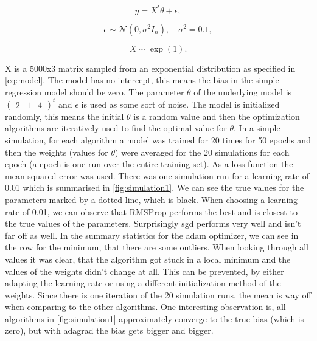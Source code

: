 \documentclass[aodsor,preprint]{imsart}
\numberwithin{equation}{section}
\theoremstyle{plain}
\begin{document}
\begin{equation}
y = X^{t} \theta + \epsilon,
\end{equation}

\begin{equation}
\epsilon \sim \mathcal{N}(0, \sigma^{2}\mathit{I}_n), \quad \sigma^{2} = 0.1,
\label{eq:model}
\end{equation}

\begin{equation}
X \sim \exp (1).
\end{equation}

X is a 5000x3 matrix sampled from an exponential distribution as specified in \ref{eq:model}. The model has no intercept, this means the bias in the simple regression model should be zero. The parameter $\theta$ of the underlying model is 
$\begin{pmatrix} 2 & 1 & 4 \end{pmatrix}^{t}$ and $\epsilon$ is used as some sort of noise. The model is initialized randomly, this means the initial $\theta$ is a random value and then the optimization algorithms are iteratively used to find the optimal value for $\theta$. In a simple simulation, for each algorithm a model was trained for 20 times for 50 epochs and then the weights (values for $\theta$) were averaged for the 20 simulations for each epoch (a epoch is one run over the entire training set). As a loss function the mean squared error was used. There was one simulation run for a learning rate of 0.01 which is summarised in \ref{fig:simulation1}. We can see the true values for the parameters marked by a dotted line, which is black. When choosing a learning rate of 0.01, we can observe that RMSProp performs the best and is closest to the true values of the parameters. Surprisingly sgd performs very well and isn't far off as well. In the summary statistics for the adam optimizer, we can see in the row for the minimum, that there are some outliers. When looking through all values it was clear, that the algorithm got stuck in a local minimum and the values of the weights didn't change at all. This can be prevented, by either adapting the learning rate or using a different initialization method of the weights. Since there is one iteration of the 20 simulation runs, the mean is way off when comparing to the other algorithms. One interesting observation is, all algorithms in \ref{fig:simulation1} approximately converge to the true bias (which is zero), but with adagrad the bias gets bigger and bigger. \\
\end{document}
